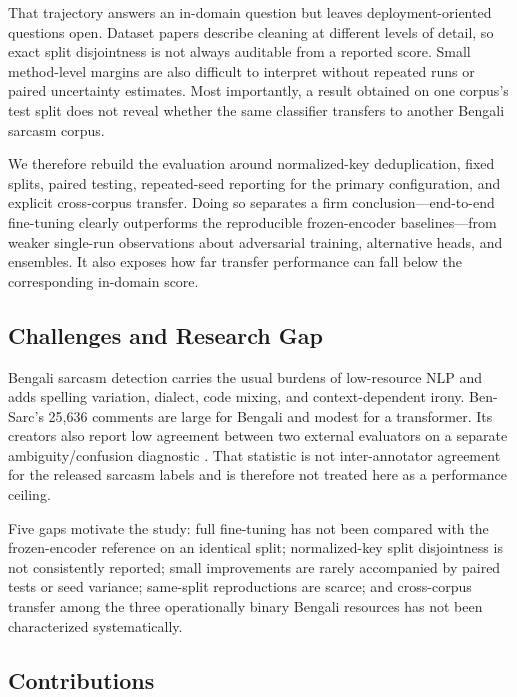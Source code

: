 \documentclass{ieeeaccess}
\newcommand{\dset}[1]{#1}
\begin{document}
That trajectory answers an in-domain question but leaves deployment-oriented questions open. Dataset papers describe cleaning at different levels of detail, so exact split disjointness is not always auditable from a reported score. Small method-level margins are also difficult to interpret without repeated runs or paired uncertainty estimates. Most importantly, a result obtained on one corpus's test split does not reveal whether the same classifier transfers to another Bengali sarcasm corpus.

We therefore rebuild the evaluation around normalized-key deduplication, fixed splits, paired testing, repeated-seed reporting for the primary configuration, and explicit cross-corpus transfer. Doing so separates a firm conclusion---end-to-end fine-tuning clearly outperforms the reproducible frozen-encoder baselines---from weaker single-run observations about adversarial training, alternative heads, and ensembles. It also exposes how far transfer performance can fall below the corresponding in-domain score.

\subsection{Challenges and Research Gap}
\label{sec:challenges-gap}

Bengali sarcasm detection carries the usual burdens of low-resource NLP and adds spelling variation, dialect, code mixing, and context-dependent irony. \dset{Ben-Sarc}'s 25{,}636 comments are large for Bengali and modest for a transformer. Its creators also report low agreement between two external evaluators on a separate ambiguity/confusion diagnostic \cite{lora2025bensarc}. That statistic is not inter-annotator agreement for the released sarcasm labels and is therefore not treated here as a performance ceiling.

Five gaps motivate the study: full fine-tuning has not been compared with the frozen-encoder reference on an identical split; normalized-key split disjointness is not consistently reported; small improvements are rarely accompanied by paired tests or seed variance; same-split reproductions are scarce; and cross-corpus transfer among the three operationally binary Bengali resources has not been characterized systematically.

\subsection{Contributions}
\label{sec:contributions}
\end{document}
